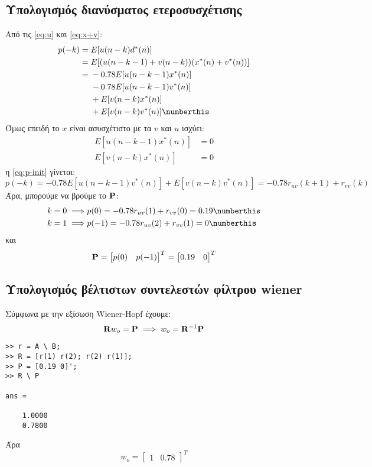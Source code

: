 \subsection{Υπολογισμός διανύσματος ετεροσυσχέτισης}
Από τις \eqref{eq:u} και \eqref{eq:x+v}:
\begin{align*}
p(-k) ={}& E[u(n - k) d^*(n)]\\
={}& E[(u(n - k - 1) + v(n - k)) (x^*(n) + v^*(n))]\\
={}& -0.78E[u(n - k - 1) x^*(n)]\\
& -0.78E[u(n - k - 1) v^*(n)]\\
& + E[v(n - k) x^*(n)]\\
& + E[v(n - k) v^*(n)]
\numberthis\label{eq:p-init}
\end{align*}
Όμως επειδή το $x$ είναι ασυσχέτιστο με τα $v$ και $u$ ισχύει:
\begin{align*}
E[u(n - k - 1) x^*(n)] &= 0\\
E[v(n - k) x^*(n)] &= 0
\end{align*}
η \eqref{eq:p-init} γίνεται:
\begin{equation}
p(-k) = -0.78E[u(n - k - 1) v^*(n)] + E[v(n - k) v^*(n)] = -0.78r_{uv}(k + 1) + r_{vv}(k)
\end{equation}
Άρα, μπορούμε να βρούμε το $\mathbf{P}$:
\begin{align*}
k = 0 \implies& p(0) = -0.78r_{uv}(1) + r_{vv}(0) = 0.19\numberthis\\
k = 1 \implies& p(-1) = -0.78r_{uv}(2) + r_{vv}(1) = 0\numberthis
\end{align*}
και
\begin{equation}
\mathbf{P} = \begin{bmatrix} p(0) & p(-1)\end{bmatrix}^T = \begin{bmatrix} 0.19 & 0\end{bmatrix}^T
\end{equation}

\subsection{Υπολογισμός βέλτιστων συντελεστών φίλτρου wiener}
Σύμφωνα με την εξίσωση Wiener-Hopf έχουμε:
\begin{equation}
\mathbf{R} w_o = \mathbf{P} \implies w_o = \mathbf{R}^{-1}\mathbf{P}
\end{equation}
\begin{lstlisting}
>> r = A \ B;
>> R = [r(1) r(2); r(2) r(1)];
>> P = [0.19 0]';
>> R \ P

ans =

    1.0000
    0.7800
\end{lstlisting}
Άρα
\begin{equation}
w_o = \begin{bmatrix} 1 & 0.78\end{bmatrix}^T
\end{equation}
